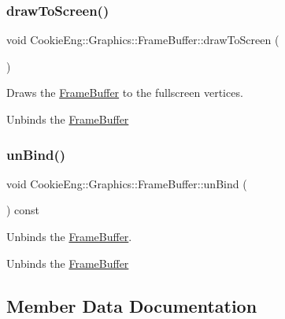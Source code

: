 \subsubsection{\texorpdfstring{draw\+To\+Screen()}{drawToScreen()}}
{\footnotesize\ttfamily void Cookie\+Eng\+::\+Graphics\+::\+Frame\+Buffer\+::draw\+To\+Screen (\begin{DoxyParamCaption}{ }\end{DoxyParamCaption})}



Draws the \hyperlink{class_cookie_eng_1_1_graphics_1_1_frame_buffer}{Frame\+Buffer} to the fullscreen vertices. 

Unbinds the \hyperlink{class_cookie_eng_1_1_graphics_1_1_frame_buffer}{Frame\+Buffer} \mbox{\label{class_cookie_eng_1_1_graphics_1_1_frame_buffer_a4c859cb199e5a770b1532a83d4b39af5}} 
\subsubsection{\texorpdfstring{un\+Bind()}{unBind()}}
{\footnotesize\ttfamily void Cookie\+Eng\+::\+Graphics\+::\+Frame\+Buffer\+::un\+Bind (\begin{DoxyParamCaption}{ }\end{DoxyParamCaption}) const}



Unbinds the \hyperlink{class_cookie_eng_1_1_graphics_1_1_frame_buffer}{Frame\+Buffer}. 

Unbinds the \hyperlink{class_cookie_eng_1_1_graphics_1_1_frame_buffer}{Frame\+Buffer} 

\subsection{Member Data Documentation}
\mbox{\label{class_cookie_eng_1_1_graphics_1_1_frame_buffer_aeeda746eb63aecba700a50a92efd37ef}} 
